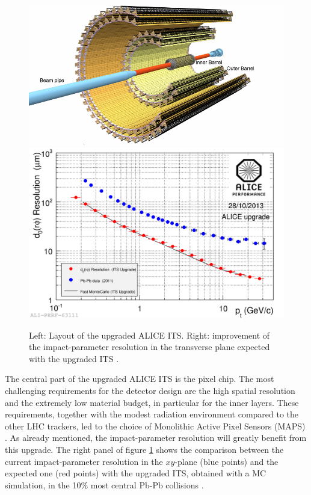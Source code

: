 \documentclass[b5paper,10pt,twoside,oldstyle,classica]{toptesi}
\begin{document}
\begin{figure}[tb]
\begin{center}
{\includegraphics[scale = 0.22]{ITSupgrade.png}}
\hspace{0cm}
{\includegraphics[scale = 0.09]{upgradedITS.png}}
\caption{Left: Layout of the upgraded ALICE ITS. Right: improvement of the impact-parameter resolution in the transverse plane expected with the upgraded ITS \cite{Siddhanta:2015aka}.}
\label{upgradedITS}
\end{center}
\end{figure} The central part of the upgraded ALICE ITS is the pixel chip. The most challenging requirements for the detector design are the high spatial resolution and the extremely low material budget, in particular for the inner layers. These requirements, together with the modest radiation environment compared to the other LHC trackers, led to the choice of Monolithic Active Pixel Sensors (MAPS) \cite{ITSup}.
As already mentioned, the impact-parameter resolution will greatly benefit from this upgrade. The right panel of figure \ref{upgradedITS} shows the comparison between the current impact-parameter resolution in the $xy$-plane (blue points) and the expected one (red points) with the upgraded ITS, obtained with a MC simulation, in the 10\% most central Pb-Pb collisions \cite{Siddhanta:2015aka}. 
\end{document}
